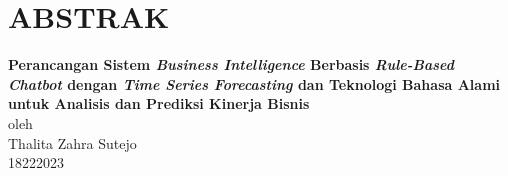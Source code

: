 \chapter*{ABSTRAK}

\begin{center}

    \textbf{Perancangan Sistem \textit{Business Intelligence} Berbasis \textit{Rule-Based Chatbot} dengan \textit{Time Series Forecasting} dan Teknologi Bahasa Alami untuk Analisis dan Prediksi Kinerja Bisnis} \\
    \vspace{0.4cm}
    oleh \\
    \vspace{0.4cm}
    Thalita Zahra Sutejo\\
    18222023\\
\end{center}

